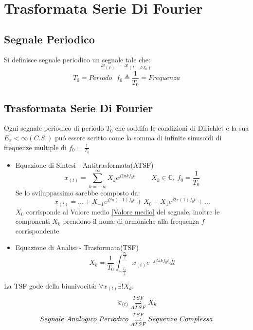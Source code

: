 \section{Trasformata Serie Di Fourier}
    \subsection{Segnale Periodico}
        Si definisce segnale periodico un segnale tale che:
        \[
            x_{(t)} = x_{(t-kT_0)}    
        \]
        \[
            T_0=Periodo\ \ \ f_0\triangleq \frac{1}{T_0} =Frequenza
        \]
    \subsection{Trasformata Serie Di Fourier}
        Ogni segnale periodico di periodo $T_0$ che soddifa le condizioni di Dirichlet e la sua $E_x < \infty (C.S.)$ puó essere scritto come la somma di 
        infinite sinusoidi di frequenze multiple di $f_0 = \frac{1}{T_0}$
        \begin{itemize}
            \item{Equazione di Sintesi - Antitrasformata(ATSF)\label{ATSF}
                \[
                    x_{(t)} = \sum_{k = -\infty}^{\infty} X_{k} e^{j2\pi kf_0t} \hspace{1cm} X_{k}\in \mathbb{C},\ f_0 = \frac{1}{T_0} 
                \]
                Se lo sviluppassimo sarebbe composto da:
                \[
                   x_{(t)} =\ldots  + X_{-1} e^{j2\pi (-1)f_0t} + X_{0} + X_{1} e^{j2\pi (1) f_0t} + \ldots 
                \]
                $X_0$ corrisponde al Valore medio \ref{Valore medio} del segnale, inoltre le componenti $X_k$ prendono il nome di armoniche alla frequenza $f$ corrispondente
            }
            \item{Equazione di Analisi - Trasformata(TSF)\label{TSF}
                \[
                    X_k =\frac{1}{T_0}\int_{-\frac{T_0}{2}}^{\frac{T_0}{2}} x_{(t)} e^{-j2\pi kf_0t} dt
                \]
            } 
        \end{itemize}
        La TSF gode della biunivocitá: $\forall x_{(t)} \exists! X_k$:
        \begin{align}
            x_{(t)} & \overunderset{TSF}{ATSF}{\rightleftharpoons} X_k  \nonumber\\
            Segnale\ Analogico\ Periodico &\overunderset{TSF}{ATSF}{\rightleftharpoons} Sequenza\ Complessa \nonumber
        \end{align}
